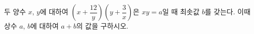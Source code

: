 두 양수 $x$, $y$에 대하여 $\left(x+\dfrac{12}{y}\right)\left(y+\dfrac{3}{x}\right)$은 $xy=a$일 때 최솟값 $b$를 갖는다. 이때 상수 $a$, $b$에 대하여 $a+b$의 값을 구하시오.
